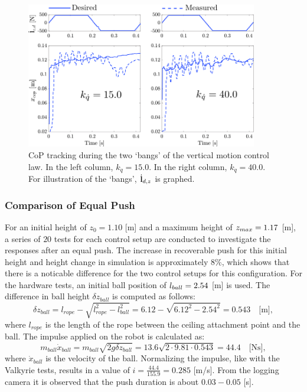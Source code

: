 \begin{figure}
\centering
\includegraphics[width=0.9\textwidth]{STYLESTUFF/atlascop.png}
\caption{\ac{CoP} tracking during the two `bangs' of the vertical motion control law. In the left column, $k_{\dot{q}}=15.0$. In the right column, $k_{\dot{q}}=40.0$. For illustration of the `bangs', $\dot{\mathbf{l}}_{d,z}$ is graphed. }
\label{fig:atlascop}
\end{figure}

\subsubsection{Comparison of Equal Push}
For an initial height of $z_0=1.10$ [m] and a maximum height of $z_{max}=1.17$ [m], a series of $20$ tests for each control setup are conducted to investigate the responses after an equal push. The increase in recoverable push for this initial height and height change in simulation is approximately $8$\%, which shows that there is a noticable difference for the two control setups for this configuration. For the hardware tests, an initial ball position of $l_{ball}=2.54$ [m] is used. The difference in ball height $\delta z_{ball}$ is computed as follows:
\begin{equation}
	\delta z_{ball} = l_{rope} - \sqrt{l_{rope}^2-l_{ball}^2} = 6.12-\sqrt{6.12^2 - 2.54^2} = 0.543 \quad \text{[m]},
\end{equation}
where $l_{rope}$ is the length of the rope between the ceiling attachment point and the ball. The impulse applied on the robot is calculated as:
\begin{equation}
m_{ball}\dot{x}_{ball} = m_{ball}\sqrt{2g\delta z_{ball} } = 13.6\sqrt{2 \cdot 9.81 \cdot 0.543} = 44.4 \quad \text{[Ns]},
\end{equation}
where $\dot{x}_{ball}$ is the velocity of the ball. Normalizing the impulse, like with the Valkyrie tests, results in a value of $i=\frac{44.4}{155.9}=0.285$ [m/s]. From the logging camera it is observed that the push duration is about $0.03-0.05$ [s].

